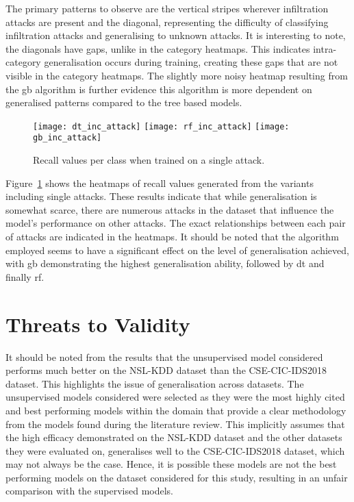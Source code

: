 The primary patterns to observe are the vertical stripes wherever infiltration
attacks are present and the diagonal, representing the difficulty of
classifying infiltration attacks and generalising to unknown attacks. It is
interesting to note, the diagonals have gaps, unlike in the category heatmaps.
This indicates intra-category generalisation occurs during training, creating
these gaps that are not visible in the category heatmaps. The slightly more
noisy heatmap resulting from the \gls{gb} algorithm is further evidence this
algorithm is more dependent on generalised patterns compared to the tree based
models.

\begin{figure}[htbp]
    \centering
    \texttt{[image: dt\_inc\_attack]}
    \texttt{[image: rf\_inc\_attack]}
    \texttt{[image: gb\_inc\_attack]}
    \caption[Single Individual Attack Results]{Recall values per class when trained on a single attack.\label{fig:inc_att}}
\end{figure}
%

Figure~\ref{fig:inc_att} shows the heatmaps of recall values generated from the
variants including single attacks. These results indicate that while
generalisation is somewhat scarce, there are numerous attacks in the dataset
that influence the model's performance on other attacks. The exact
relationships between each pair of attacks are indicated in the heatmaps. It
should be noted that the algorithm employed seems to have a significant effect
on the level of generalisation achieved, with \gls{gb} demonstrating the
highest generalisation ability, followed by \gls{dt} and finally \gls{rf}.

\section{Threats to Validity}%
\label{sec:threats}
It should be noted from the results that the unsupervised model considered
performs much better on the NSL-KDD dataset than the CSE-CIC-IDS2018 dataset.
This highlights the issue of generalisation across datasets. The unsupervised
models considered were selected as they were the most highly cited and best
performing models within the domain that provide a clear methodology from the
models found during the literature review. This implicitly assumes that the
high efficacy demonstrated on the NSL-KDD dataset and the other datasets they
were evaluated on, generalises well to the CSE-CIC-IDS2018 dataset, which may
not always be the case. Hence, it is possible these models are not the best
performing models on the dataset considered for this study, resulting in an
unfair comparison with the supervised models.

